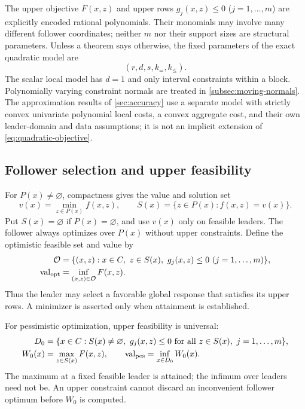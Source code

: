 The upper objective $F(x,z)$ and upper rows $g_j(x,z)\le0$
($j=1,\ldots,m$) are explicitly encoded rational polynomials.
Their monomials may involve many different follower coordinates; neither
$m$ nor their support sizes are structural parameters. Unless a theorem
says otherwise, the fixed parameters of the exact quadratic model are
\begin{equation}\label{eq:structural-parameters}
                    (r,d,s,k_=,k_{\le}).
\end{equation}
The scalar local model has $d=1$ and only interval constraints within a
block. Polynomially varying constraint normals are treated in
\cref{subsec:moving-normals}. The approximation results of
\cref{sec:accuracy} use a separate model with strictly convex univariate
polynomial local costs, a convex aggregate cost, and their own
leader-domain and data assumptions; it is not an implicit extension of
\eqref{eq:quadratic-objective}.

\subsection{Follower selection and upper feasibility}\label{subsec:semantics}

For $P(x)\ne\varnothing$, compactness gives the value and solution set
\begin{equation}\label{eq:follower-value}
 v(x)=\min_{z\in P(x)} f(x,z),\qquad
 S(x)=\{z\in P(x):f(x,z)=v(x)\}.
\end{equation}
Put $S(x)=\varnothing$ if $P(x)=\varnothing$, and use $v(x)$ only
on feasible leaders. The follower always optimizes over $P(x)$ without
upper constraints. Define the optimistic feasible set and value by
\begin{align}
 \mathcal O&=\{(x,z):x\in C,\ z\in S(x),\
                             g_j(x,z)\le0\ (j=1,\ldots,m)\},
 \label{eq:optimistic-set}\\
 \operatorname{val}_{\rm opt}&=\inf_{(x,z)\in\mathcal O} F(x,z).
 \label{eq:optimistic-value}
\end{align}
Thus the leader may select a favorable global response that satisfies its
upper rows. A minimizer is asserted only when attainment is established.

For pessimistic optimization, upper feasibility is universal:
\begin{align}
 D_0&=\{x\in C:S(x)\ne\varnothing,\
             g_j(x,z)\le0\text{ for all }z\in S(x),\ j=1,\ldots,m\},
 \label{eq:pessimistic-domain}\\
 W_0(x)&=\max_{z\in S(x)}F(x,z),\qquad
 \operatorname{val}_{\rm pes}=\inf_{x\in D_0}W_0(x).
 \label{eq:pessimistic-value}
\end{align}
The maximum at a fixed feasible leader is attained; the infimum over
leaders need not be. An upper constraint cannot discard an inconvenient
follower optimum before $W_0$ is computed.

